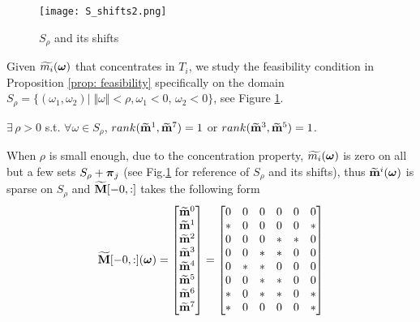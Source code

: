 \begin{figure}
\centering
\texttt{[image: S\_shifts2.png]}
\caption{$S_{\rho}$ and its shifts}
\label{fig: S-shifts}
\end{figure}
Given $\widetilde{m_{i}}(\boldsymbol{\omega})$ that concentrates in $T_i$, we study the feasibility condition in Proposition \ref{prop: feasibility} specifically on the domain $S_{\rho} = \{(\omega_1,\omega_2)|\;\Vert\omega\Vert < \rho, \omega_1 <0,\,\omega_2<0\}$, see Figure \ref{fig: S-shifts}. 

\begin{lemma}\label{lem: rank1}
$\exists\, \rho>0$ s.t. $\forall \omega\in S_\rho$, $rank(\widetilde{\mathbf{m}}^{1},\widetilde{\mathbf{m}}^{7})=1$ or $rank(\widetilde{\mathbf{m}}^{3},\widetilde{\mathbf{m}}^{5}) = 1$.
\end{lemma}
When $\rho$ is small enough, due to the concentration property, $\widetilde{m_{i}}(\boldsymbol{\omega})$ is zero on all but a few sets $S_\rho + \boldsymbol{\pi}_j$ (see Fig.\ref{fig: S-shifts} for reference of $S_\rho$ and its shifts), thus $\widetilde{\mathbf{m}}^{i}(\boldsymbol{\omega})$ is sparse on $S_\rho$ and $\widetilde{\mathbf{M}}[-0,:]$ takes the following form
\begin{align}
\label{eq: sparse-mat}
\widetilde{\mathbf{M}}[-0,:](\boldsymbol{\omega})=
\begin{bmatrix}
\widetilde{\mathbf{m}}^{0}\\
\widetilde{\mathbf{m}}^{1}\\
\widetilde{\mathbf{m}}^{2}\\
\widetilde{\mathbf{m}}^{3}\\
\widetilde{\mathbf{m}}^{4}\\
\widetilde{\mathbf{m}}^{5}\\
\widetilde{\mathbf{m}}^{6}\\
\widetilde{\mathbf{m}}^{7}
\end{bmatrix}
=
\begin{bmatrix}
0 & 0 & 0 & 0 & 0 & 0\\
* & 0 & 0 & 0 & 0 & *\\
0 & 0 & 0 & * & * & 0\\
0 & 0 & * & * & 0 & 0\\
0 & * & * & 0 & 0 & 0\\
0 & 0 & * & * & 0 & 0\\
* & 0 & * & * & 0 & *\\
* & 0 & 0 & 0 & 0 & *
\end{bmatrix}
\end{align}
